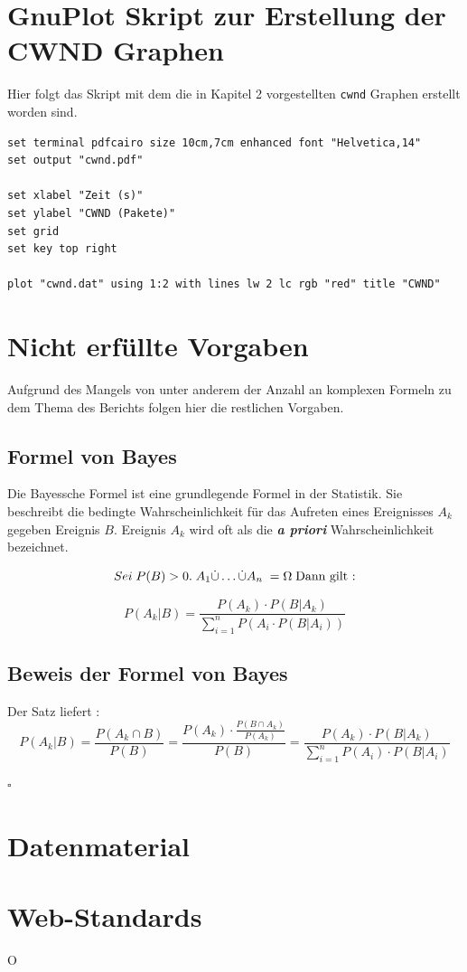 \documentclass[paper=a4,fontsize=12pt,ngerman]{scrartcl}
\begin{document}
\section{GnuPlot Skript zur Erstellung der CWND Graphen}
Hier folgt das Skript mit dem die in Kapitel 2 vorgestellten \texttt{cwnd} Graphen erstellt worden sind.

\begin{verbatim}
set terminal pdfcairo size 10cm,7cm enhanced font "Helvetica,14"
set output "cwnd.pdf"

set xlabel "Zeit (s)"
set ylabel "CWND (Pakete)"
set grid
set key top right

plot "cwnd.dat" using 1:2 with lines lw 2 lc rgb "red" title "CWND"
\end{verbatim}


\section{Nicht erfüllte Vorgaben}
Aufgrund des Mangels von unter anderem der Anzahl an komplexen Formeln zu dem Thema des Berichts folgen hier die 
restlichen Vorgaben.

\subsection{Formel von Bayes}
Die Bayessche Formel ist eine grundlegende Formel in der Statistik. Sie beschreibt die bedingte Wahrscheinlichkeit für
das Aufreten eines Ereignisses $A_k$ gegeben Ereignis $B$. 
Ereignis $A_k$ wird oft als die \textbf{\textit{a priori}} Wahrscheinlichkeit bezeichnet.

\[
Sei \; P(B)>0. \; A_1 \dot{\cup} \ldots \dot{\cup} A_n \;  =\Omega \; \text{Dann gilt :} \newline
\]

\[
P(A_k | B) = \frac{P(A_k)  \cdot P(B | A_k)}{\sum_{i=1}^{n}P(A_i  \cdot P(B | A_i))}
\]

\subsection{Beweis der Formel von Bayes}

Der Satz liefert : 
\[ 
P(A_k | B) = \frac{P(A_k \cap B)}{P(B)} = \frac{P(A_k) \cdot \frac{P(B \cap A_k)}{P(A_k)}} {P(B)} = \frac{P(A_k) \cdot P(B | A_k)}{ \sum_{i=1}^{n}P(A_i) \cdot P(B | A_i)}
\]

$\square$



\section{Datenmaterial}


\section{Web-Standards}
O
\end{document}
